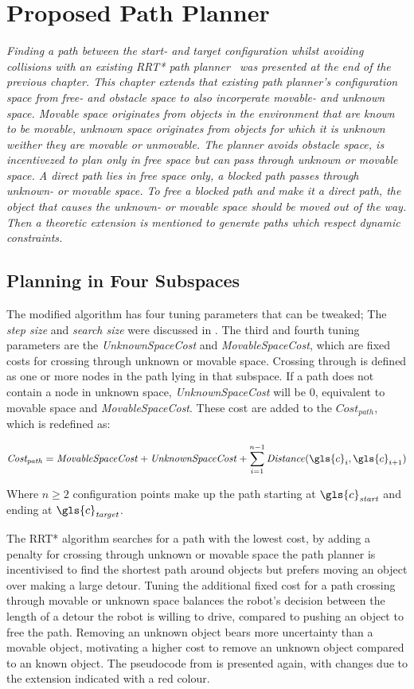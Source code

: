 \chapter{Proposed Path Planner}%
\label{chap:proposed_planning}
\textit{Finding a path between the start- and target configuration whilst avoiding collisions with an existing \ac{RRT*} path planner~\cite{chen_fast_2018} was presented at the end of the previous chapter. This chapter extends that existing path planner's configuration space from free- and obstacle space to also incorperate movable- and unknown space. Movable space originates from objects in the environment that are known to be movable, unknown space originates from objects for which it is unknown weither they are movable or unmovable. The planner avoids obstacle space, is incentivezed to plan only in free space but can pass through unknown or movable space. A direct path lies in free space only, a blocked path passes through unknown- or movable space. To free a blocked path and make it a direct path, the object that causes the unknown- or movable space should be moved out of the way. Then a theoretic extension is mentioned to generate paths which respect dynamic constraints.\bs}

\section{Planning in Four Subspaces}\label{sec:planning_in_four_subspaces}
The modified algorithm has four tuning parameters that can be tweaked; The \textit{step size} and \textit{search size} were discussed in . The third and fourth tuning parameters are the \textit{UnknownSpaceCost} and \textit{MovableSpaceCost}, which are fixed costs for crossing through unknown or movable space. Crossing through is defined as one or more nodes in the path lying in that subspace. If a path does not contain a node in unknown space, \textit{UnknownSpaceCost} will be 0, equivalent to movable space and \textit{MovableSpaceCost}. These cost are added to the $\mathit{Cost_{path}}$, which is redefined as:\bs

\[\mathit{Cost_{path}} = \mathit{MovableSpaceCost} + \mathit{UnknownSpaceCost} + \sum_{i=1}^{n-1} \mathit{Distance}(\gls{c}_i, \gls{c}_{i+1})\]

Where $\mathit{n} \geq 2$ configuration points make up the path starting at $\gls{c}_\mathit{start}$ and ending at $\gls{c}_\mathit{target}$.\bs

The \ac{RRT*} algorithm searches for a path with the lowest cost, by adding a penalty for crossing through unknown or movable space the path planner is incentivised to find the shortest path around objects but prefers moving an object over making a large detour. Tuning the additional fixed cost for a path crossing through movable or unknown space balances the robot's decision between the length of a detour the robot is willing to drive, compared to pushing an object to free the path. Removing an unknown object bears more uncertainty than a movable object, motivating a higher cost to remove an unknown object compared to an known object. The pseudocode from  is presented again, with changes due to the extension indicated with a red colour.\bs

